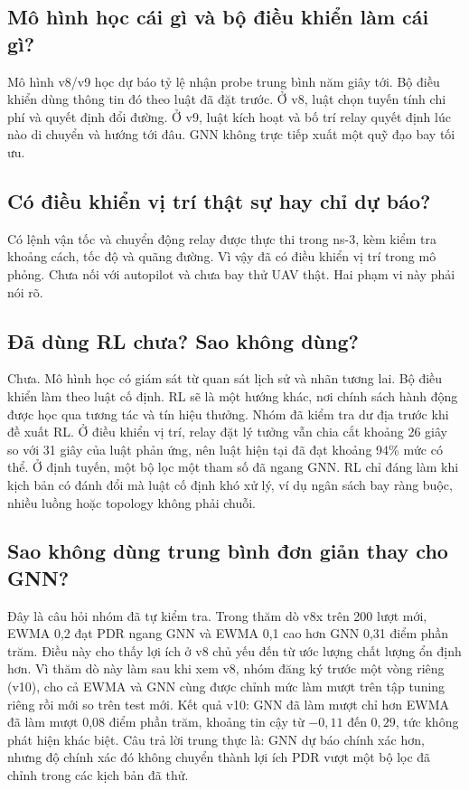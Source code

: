 \subsection*{Mô hình học cái gì và bộ điều khiển làm cái gì?}
Mô hình v8/v9 học dự báo tỷ lệ nhận probe trung bình năm giây tới. Bộ điều khiển dùng thông tin đó theo luật đã đặt trước. Ở v8, luật chọn tuyến tính chi phí và quyết định đổi đường. Ở v9, luật kích hoạt và bố trí relay quyết định lúc nào di chuyển và hướng tới đâu. GNN không trực tiếp xuất một quỹ đạo bay tối ưu.

\subsection*{Có điều khiển vị trí thật sự hay chỉ dự báo?}
Có lệnh vận tốc và chuyển động relay được thực thi trong ns-3, kèm kiểm tra khoảng cách, tốc độ và quãng đường. Vì vậy đã có điều khiển vị trí trong mô phỏng. Chưa nối với autopilot và chưa bay thử UAV thật. Hai phạm vi này phải nói rõ.

\subsection*{Đã dùng RL chưa? Sao không dùng?}
Chưa. Mô hình học có giám sát từ quan sát lịch sử và nhãn tương lai. Bộ điều khiển làm theo luật cố định. RL sẽ là một hướng khác, nơi chính sách hành động được học qua tương tác và tín hiệu thưởng. Nhóm đã kiểm tra dư địa trước khi đề xuất RL. Ở điều khiển vị trí, relay đặt lý tưởng vẫn chia cắt khoảng 26 giây so với 31 giây của luật phản ứng, nên luật hiện tại đã đạt khoảng 94\% mức có thể. Ở định tuyến, một bộ lọc một tham số đã ngang GNN. RL chỉ đáng làm khi kịch bản có đánh đổi mà luật cố định khó xử lý, ví dụ ngân sách bay ràng buộc, nhiều luồng hoặc topology không phải chuỗi.

\subsection*{Sao không dùng trung bình đơn giản thay cho GNN?}
Đây là câu hỏi nhóm đã tự kiểm tra. Trong thăm dò v8x trên 200 lượt mới, EWMA 0,2 đạt PDR ngang GNN và EWMA 0,1 cao hơn GNN 0,31 điểm phần trăm. Điều này cho thấy lợi ích ở v8 chủ yếu đến từ ước lượng chất lượng ổn định hơn. Vì thăm dò này làm sau khi xem v8, nhóm đăng ký trước một vòng riêng (v10), cho cả EWMA và GNN cùng được chỉnh mức làm mượt trên tập tuning riêng rồi mới so trên test mới. Kết quả v10: GNN đã làm mượt chỉ hơn EWMA đã làm mượt 0,08 điểm phần trăm, khoảng tin cậy từ $-0{,}11$ đến $0{,}29$, tức không phát hiện khác biệt. Câu trả lời trung thực là: GNN dự báo chính xác hơn, nhưng độ chính xác đó không chuyển thành lợi ích PDR vượt một bộ lọc đã chỉnh trong các kịch bản đã thử.

